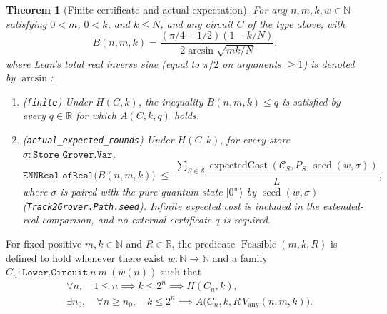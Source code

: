 \documentclass[11pt,a4paper]{article}
\newtheorem{theorem}{Theorem}[section]
\theoremstyle{definition}
\theoremstyle{remark}
\begin{document}
\begin{theorem}[Finite certificate and actual expectation]
\label{thm:findany-finite}
For any \(n,m,k,w \in \mathbb{N}\) satisfying \(0 < m\), \(0 < k\), and \(k \le N\), and any circuit \(C\) of the type above, with
\[
  B(n,m,k) = \frac{(\pi/4 + 1/2)(1 - k/N)}{2\arcsin\sqrt{mk/N}},
\]
where Lean's total real inverse sine (equal to \(\pi/2\) on arguments \(\ge 1\)) is denoted by \(\arcsin\):
\begin{enumerate}
\item \textup{(\texttt{finite})} Under \(H(C,k)\), the inequality \(B(n,m,k) \le q\) is satisfied by every \(q \in \mathbb{R}\) for which \(A(C,k,q)\) holds.
\item \textup{(\texttt{actual\_\allowbreak expected\_\allowbreak rounds})} Under \(H(C,k)\), for every store \(\sigma : \texttt{Store Grover.Var}\),
\[
  \texttt{ENNReal.ofReal}\bigl(B(n,m,k)\bigr) \;\le\;
  \frac{\displaystyle\sum_{S \in \mathcal{S}} \operatorname{expectedCost}(\mathcal{C}_S, P_S, \operatorname{seed}(w,\sigma))}{L},
\]
where \(\sigma\) is paired with the pure quantum state \(|0^w\rangle\) by \(\operatorname{seed}(w,\sigma)\) (\texttt{Track2Grover.\allowbreak Path.\allowbreak seed}). Infinite expected cost is included in the extended-real comparison, and no external certificate \(q\) is required.
\end{enumerate}
\end{theorem}

For fixed positive \(m, k \in \mathbb{N}\) and \(R \in \mathbb{R}\), the predicate \(\operatorname{Feasible}(m,k,R)\) is defined to hold whenever there exist \(w : \mathbb{N} \to \mathbb{N}\) and a family \(C_n : \texttt{Lower.Circuit}\ n\ m\ (w(n))\) such that
\[
  \begin{aligned}
  &\forall n,\quad 1 \le n \implies k \le 2^n \implies H(C_n, k), \\
  &\exists n_0,\quad \forall n \ge n_0,\quad k \le 2^n \implies A\bigl(C_n, k, R\,V_{\mathrm{any}}(n,m,k)\bigr).
  \end{aligned}
\]
\end{document}
